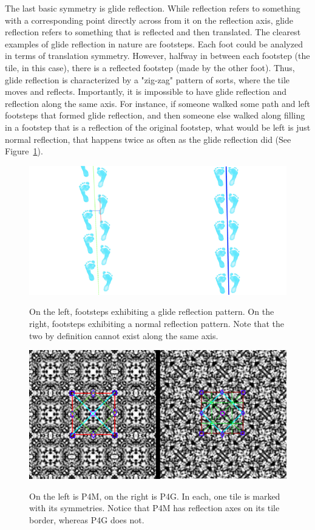 The last basic symmetry is glide reflection. While reflection refers to something with a corresponding point directly across from it on the reflection axis, glide reflection refers to something that is reflected and then translated. The clearest examples of glide reflection in nature are footsteps. Each foot could be analyzed in terms of translation symmetry. However, halfway in between each footstep (the tile, in this case), there is a reflected footstep (made by the other foot). Thus, glide reflection is characterized by a "zig-zag" pattern of sorts, where the tile moves and reflects. Importantly, it is impossible to have glide reflection and reflection along the same axis. For instance, if someone walked some path and left footsteps that formed glide reflection, and then someone else walked along filling in a footstep that is a reflection of the original footstep, what would be left is just normal reflection, that happens twice as often as the glide reflection did (See Figure~\ref{glide}).

\begin{figure}
\centering
\includegraphics[width=0.9\columnwidth]{glide}
\label{glide}
\caption{On the left, footsteps exhibiting a glide reflection pattern. On the right, footsteps exhibiting a normal reflection pattern. Note that the two by definition cannot exist along the same axis.}
\end{figure}

\begin{figure}[!ht]
\centering
\includegraphics[width=0.9\columnwidth]{ann_images}
\label{fig:P4GvP4M}
\caption{On the left is P4M, on the right is P4G. In each, one tile is marked with its symmetries. Notice that P4M has reflection axes on its tile border, whereas P4G does not.}
\end{figure}

